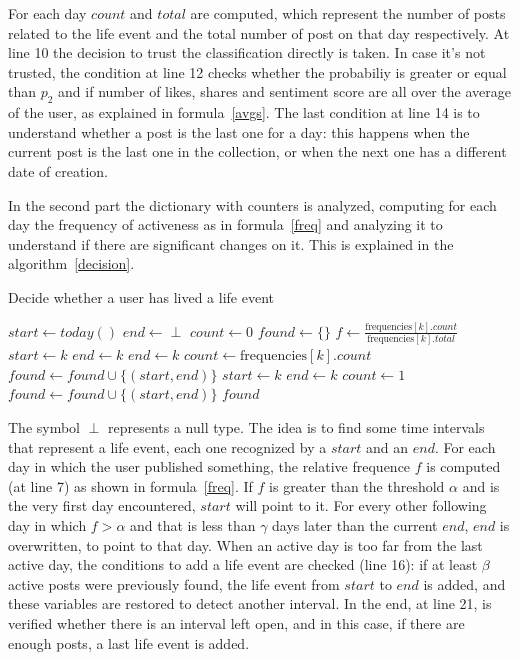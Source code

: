 For each day $count$ and $total$ are computed, which represent the number of posts related to the life event and the total number of post on that day respectively. At line 10 the decision to trust the classification directly is taken. In case it's not trusted, the condition at line 12 checks whether the probabiliy is greater or equal than $p_2$ and if number of likes, shares and sentiment score are all over the average of the user, as explained in formula~\ref{avgs}. The last condition at line 14 is to understand whether a post is the last one for a day: this happens when the current post is the last one in the collection, or when the next one has a different date of creation.

In the second part the dictionary with counters is analyzed, computing for each day the frequency of activeness as in formula~\ref{freq} and analyzing it to understand if there are significant changes on it. This is explained in the algorithm~\ref{decision}.

\begin{algorithm}
\caption{Decide whether a user has lived a life event}
\label{decision}
\begin{algorithmic}[1]
\State $start \gets today()$
\State $end \gets \perp$
\State $count \gets 0$
\State $found \gets \{\}$
	\State $f \gets \frac{\text{frequencies}[k].count}{\text{frequencies}[k].total}$
			\State $start \gets k$
			\State $end \gets k$
		\EndIf
			\State $end \gets k$
			\State $count \gets \text{frequencies}[k].count$
		\Else
				\State $found \gets found \cup \{(start, end)\}$
			\EndIf
			\State $start \gets k$
			\State $end \gets k$
			\State $count \gets 1$
		\EndIf
	\EndIf
\EndFor
{}
	\State $found \gets found \cup \{(start, end)\}$
\EndIf
\Return $found$
\EndFunction
\end{algorithmic}
\end{algorithm}

The symbol $\perp$ represents a null type. The idea is to find some time intervals that represent a life event, each one recognized by a $start$ and an $end$. For each day in which the user published something, the relative frequence $f$ is computed (at line 7) as shown in formula~\ref{freq}. If $f$ is greater than the threshold $\alpha$ and is the very first day encountered, $start$ will point to it. For every other following day in which $f > \alpha$ and that is less than $\gamma$ days later than the current $end$, $end$ is overwritten, to point to that day. When an active day is too far from the last active day, the conditions to add a life event are checked (line 16): if at least $\beta$ active posts were previously found, the life event from $start$ to $end$ is added, and these variables are restored to detect another interval. In the end, at line 21, is verified whether there is an interval left open, and in this case, if there are enough posts, a last life event is added.

